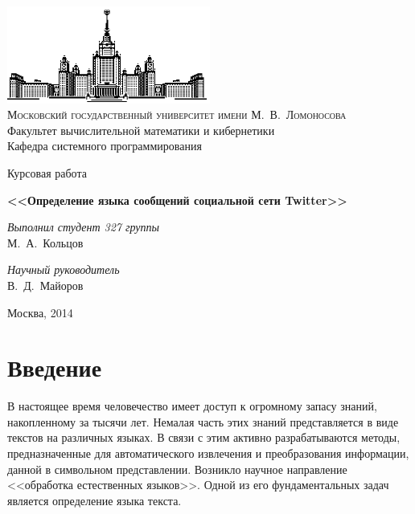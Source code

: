 \documentclass[a4paper, 14pt]{article}
\begin{document}
\linespread{1.3} %
\renewcommand{\rmdefault}{ftm} %
\frenchspacing
\thispagestyle{empty}

\begin{center}
\ \vspace{-3cm}

\includegraphics[width=0.5\textwidth]{msu.eps}\\

{\scshape Московский государственный университет имени М.~В.~Ломоносова}\\
Факультет вычислительной математики и кибернетики\\
Кафедра системного программирования

\vfill

{\LARGE Курсовая работа}

\vspace{1cm}

{\Huge\bfseries <<Определение языка сообщений социальной сети Twitter>>} \\

\end{center}

\vspace{1cm}

\begin{flushright}
  \large
  \textit{Выполнил студент 327 группы}\\
  М.~А.~Кольцов

  \vspace{5mm}

  \textit{Научный руководитель}\\
  В.~Д.~Майоров
\end{flushright}

\vfill

\begin{center}
Москва, 2014
\end{center}

\pagebreak
\tableofcontents
\pagebreak

\newtheorem{definition} {Определение}
\newtheorem{option} {Свойство}
\newtheorem{theorem} {Теорема}


\section{Введение}
	        В настоящее время человечество имеет доступ к огромному запасу знаний, накопленному за тысячи лет. Немалая часть этих знаний представляется
	        в виде текстов на различных языках. В связи с этим активно разрабатываются методы, предназначенные для автоматического извлечения
	        и преобразования информации, данной в символьном представлении. 
	        Возникло научное направление <<обработка естественных языков>>. Одной из его фундаментальных задач является определение языка текста. 
\end{document}
